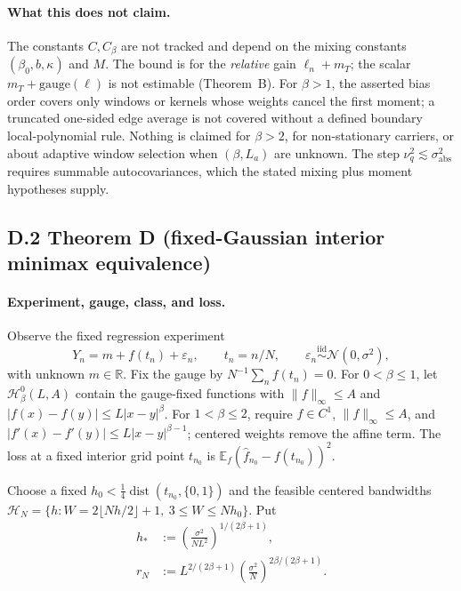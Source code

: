 \paragraph{What this does not claim.} The constants $C,C_\beta$ are not tracked and depend on the mixing constants $(\beta_0,b,\kappa)$ and $M$. The bound is for the \emph{relative} gain $\ell_n+m_T$; the scalar $m_T+\text{gauge}(\ell)$ is not estimable (Theorem~B). For $\beta>1$, the asserted bias order covers only windows or kernels whose weights cancel the first moment; a truncated one-sided edge average is not covered without a defined boundary local-polynomial rule. Nothing is claimed for $\beta>2$, for non-stationary carriers, or about adaptive window selection when $(\beta,L_a)$ are unknown. The step $\nu_q^2\lesssim\sigma_{\mathrm{abs}}^2$ requires summable autocovariances, which the stated mixing plus moment hypotheses supply.

\subsection{D.2 Theorem D (fixed-Gaussian interior minimax equivalence)}

\paragraph{Experiment, gauge, class, and loss.} Observe the fixed regression experiment
\[
Y_n=m+f(t_n)+\varepsilon_n,\qquad t_n=n/N,\qquad
\varepsilon_n\stackrel{\mathrm{iid}}{\sim}\mathcal N(0,\sigma^2),
\]
with unknown $m\in\mathbb R$. Fix the gauge by $N^{-1}\sum_nf(t_n)=0$. For $0<\beta\le1$, let $\mathcal H_\beta^0(L,A)$ contain the gauge-fixed functions with $\|f\|_\infty\le A$ and $|f(x)-f(y)|\le L|x-y|^\beta$. For $1<\beta\le2$, require $f\in C^1$, $\|f\|_\infty\le A$, and $|f'(x)-f'(y)|\le L|x-y|^{\beta-1}$; centered weights remove the affine term. The loss at a fixed interior grid point $t_{n_0}$ is $\mathbb E_f(\hat f_{n_0}-f(t_{n_0}))^2$.

Choose a fixed $h_0<\tfrac14\operatorname{dist}(t_{n_0},\{0,1\})$ and the feasible centered bandwidths $\mathcal H_N=\{h: W=2\lfloor Nh/2\rfloor+1,\ 3\le W\le Nh_0\}$. Put
\[
\begin{aligned}
h_*&:=\left(\frac{\sigma^2}{NL^2}\right)^{1/(2\beta+1)},\\
r_N&:=L^{2/(2\beta+1)}
\left(\frac{\sigma^2}{N}\right)^{2\beta/(2\beta+1)}.
\end{aligned}
\]

